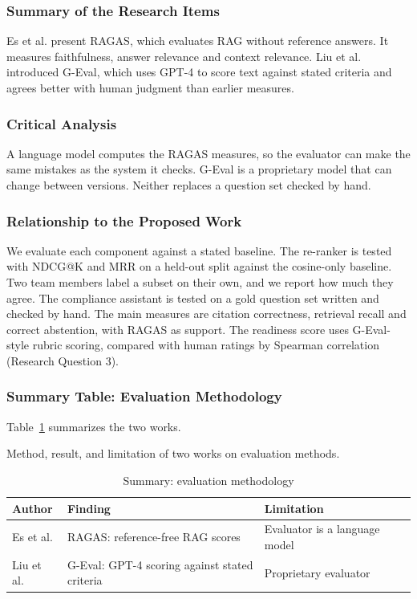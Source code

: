 \documentclass{FastFyp}
\makeatletter
\newcommand{\capdesc}[1]{%
  \par\nobreak
  \begingroup
  \setstretch{1}%
  \ifdefstring{\@captype}{figure}%
    {\vspace{0.2\baselineskip}}%
    {\vspace{-0.8\baselineskip}}%
  {\centering\normalfont\itshape\small
   \begin{minipage}{0.92\textwidth}\centering #1\end{minipage}\par}%
  \endgroup
  \vspace{0.4\baselineskip}%
}
\makeatother
\begin{document}
\subsubsection{Summary of the Research Items}
Es et al. \cite{ref:es2024ragas} present RAGAS, which evaluates RAG without reference answers. It measures faithfulness, answer relevance and context relevance. Liu et al. \cite{ref:liu2023geval} introduced G-Eval, which uses GPT-4 to score text against stated criteria and agrees better with human judgment than earlier measures.

\subsubsection{Critical Analysis}
A language model computes the RAGAS measures, so the evaluator can make the same mistakes as the system it checks. G-Eval is a proprietary model that can change between versions. Neither replaces a question set checked by hand.

\subsubsection{Relationship to the Proposed Work}
We evaluate each component against a stated baseline. The re-ranker is tested with NDCG@K and MRR on a held-out split against the cosine-only baseline. Two team members label a subset on their own, and we report how much they agree. The compliance assistant is tested on a gold question set written and checked by hand. The main measures are citation correctness, retrieval recall and correct abstention, with RAGAS as support. The readiness score uses G-Eval-style rubric scoring, compared with human ratings by Spearman correlation (Research Question 3).

\subsubsection{Summary Table: Evaluation Methodology}
Table~\ref{tab:lr-evaluation} summarizes the two works.
\begin{table}[!ht]
\centering
\caption{Summary: evaluation methodology}
\capdesc{Method, result, and limitation of two works on evaluation methods.}
\begin{tabular}{|p{3.0cm}|p{4.0cm}|p{2.8cm}|p{4.0cm}|}
\hline
\textbf{Author} & \textbf{Finding} & \textbf{Limitation} \\
\hline
Es et al. \cite{ref:es2024ragas} & RAGAS: reference-free RAG scores & Evaluator is a language model \\
\hline
Liu et al. \cite{ref:liu2023geval} & G-Eval: GPT-4 scoring against stated criteria & Proprietary evaluator \\
\hline
\end{tabular}
\label{tab:lr-evaluation}
\end{table}
\end{document}
